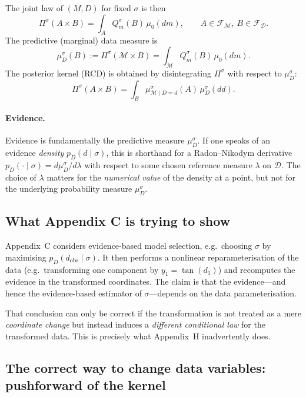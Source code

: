 \documentclass[11pt]{article}
\theoremstyle{remark}
\newcommand{\modelspace}{\mathcal{M}}
\newcommand{\dataspace}{\mathcal{D}}
\begin{document}
The joint law of \((M,D)\) for fixed \(\sigma\) is then
\begin{equation}\label{eq:joint-Pi-sigma}
\Pi^\sigma(A\times B)=\int_A Q_m^\sigma(B)\,\mu_0(dm),\qquad
A\in\mathcal F_{\modelspace},\ B\in\mathcal F_{\dataspace}.
\end{equation}
The predictive (marginal) data measure is
\begin{equation}\label{eq:predictive-muD}
\mu_D^\sigma(B) := \Pi^\sigma(\modelspace\times B)=\int_{\modelspace} Q_m^\sigma(B)\,\mu_0(dm).
\end{equation}
The posterior kernel (RCD) is obtained by disintegrating \(\Pi^\sigma\) with respect to \(\mu_D^\sigma\):
\[
\Pi^\sigma(A\times B)=\int_B \mu_{\modelspace\mid D=d}^\sigma(A)\,\mu_D^\sigma(dd).
\]

\paragraph{Evidence.}
Evidence is fundamentally the predictive measure \(\mu_D^\sigma\). If one speaks of an evidence
\emph{density} \(p_D(d\mid\sigma)\), this is shorthand for a Radon--Nikodym derivative
\(p_D(\cdot\mid\sigma)=d\mu_D^\sigma/d\lambda\) with respect to some chosen reference measure
\(\lambda\) on \(\dataspace\). The choice of \(\lambda\) matters for the \emph{numerical value} of the
density at a point, but not for the underlying probability measure \(\mu_D^\sigma\).

\subsection{What Appendix C is trying to show}

Appendix~C considers evidence-based model selection, e.g.\ choosing \(\sigma\) by maximising
\(p_D(d_{\mathrm{obs}}\mid\sigma)\). It then performs a nonlinear reparameterisation of the data
(e.g.\ transforming one component by \(y_1=\tan(d_1)\)) and recomputes the evidence in the
transformed coordinates. The claim is that the evidence---and hence the evidence-based estimator
of \(\sigma\)---depends on the data parameterisation.

That conclusion can only be correct if the transformation is not treated as a mere \emph{coordinate change}
but instead induces a \emph{different conditional law} for the transformed data. This is precisely what
Appendix~H inadvertently does.

\subsection{The correct way to change data variables: pushforward of the kernel}
\end{document}
